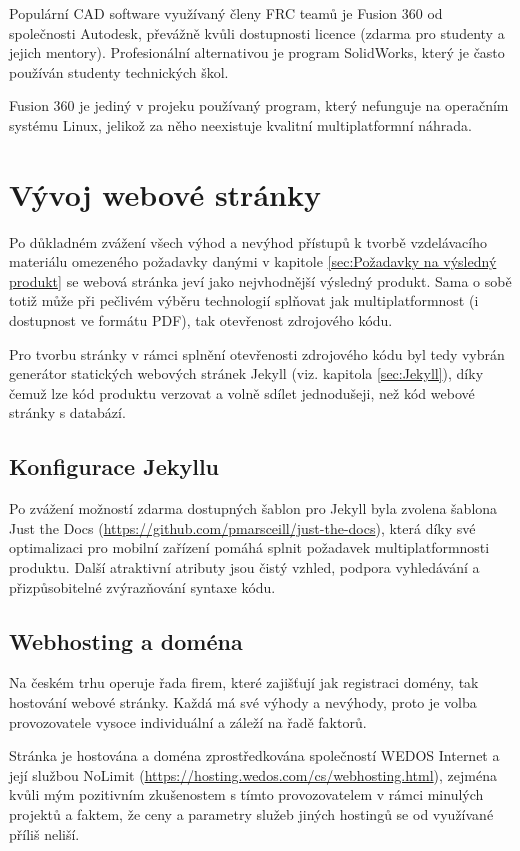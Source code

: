 \documentclass[a4paper, 12pt]{article}
\begin{document}
  Populární CAD software využívaný členy FRC teamů je Fusion 360 od společnosti Autodesk, převážně kvůli dostupnosti licence (zdarma pro studenty a jejich mentory). Profesionální alternativou je program SolidWorks, který je často používán studenty technických škol.

  Fusion 360 je jediný v projeku používaný program, který nefunguje na operačním systému Linux,  jelikož za něho neexistuje kvalitní multiplatformní náhrada.


  \section{Vývoj webové stránky}
  Po důkladném zvážení všech výhod a nevýhod přístupů k tvorbě vzdelávacího materiálu omezeného požadavky danými v kapitole \ref{sec:Požadavky na výsledný produkt} se webová stránka jeví jako nejvhodnější výsledný produkt. Sama o sobě totiž může při pečlivém výběru technologií splňovat jak multiplatformnost (i dostupnost ve formátu PDF), tak otevřenost zdrojového kódu.

  Pro tvorbu stránky v rámci splnění otevřenosti zdrojového kódu byl tedy vybrán generátor statických webových stránek Jekyll (viz. kapitola \ref{sec:Jekyll}), díky čemuž lze kód produktu verzovat a volně sdílet jednodušeji, než kód webové stránky s databází.


  \subsection{Konfigurace Jekyllu}
  Po zvážení možností zdarma dostupných šablon pro Jekyll byla zvolena šablona Just the Docs (\url{https://github.com/pmarsceill/just-the-docs}), která díky své optimalizaci pro mobilní zařízení pomáhá splnit požadavek multiplatformnosti produktu. Další atraktivní atributy jsou čistý vzhled, podpora vyhledávání a přizpůsobitelné zvýrazňování syntaxe kódu.


  \subsection{Webhosting a doména} \label{sec:Webhosting a doména}
  Na českém trhu operuje řada firem, které zajišťují jak registraci domény, tak hostování webové stránky. Každá má své výhody a nevýhody, proto je volba provozovatele vysoce individuální a záleží na řadě faktorů.

  Stránka je hostována a doména zprostředkována společností WEDOS Internet a její službou NoLimit (\url{https://hosting.wedos.com/cs/webhosting.html}), zejména kvůli mým pozitivním zkušenostem s tímto provozovatelem v rámci minulých projektů a faktem, že ceny a parametry služeb jiných hostingů se od využívané příliš neliší.
\end{document}
